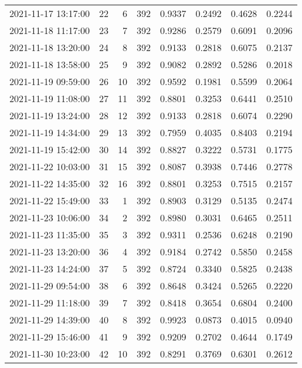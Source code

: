 \begin{longtable}{lrrrrrrr}
2021-11-17 13:17:00 &   22 &    6 &    392 &   0.9337 & 0.2492 & 0.4628 & 0.2244 \\
2021-11-18 11:17:00 &   23 &    7 &    392 &   0.9286 & 0.2579 & 0.6091 & 0.2096 \\
2021-11-18 13:20:00 &   24 &    8 &    392 &   0.9133 & 0.2818 & 0.6075 & 0.2137 \\
2021-11-18 13:58:00 &   25 &    9 &    392 &   0.9082 & 0.2892 & 0.5286 & 0.2018 \\
2021-11-19 09:59:00 &   26 &   10 &    392 &   0.9592 & 0.1981 & 0.5599 & 0.2064 \\
2021-11-19 11:08:00 &   27 &   11 &    392 &   0.8801 & 0.3253 & 0.6441 & 0.2510 \\
2021-11-19 13:24:00 &   28 &   12 &    392 &   0.9133 & 0.2818 & 0.6074 & 0.2290 \\
2021-11-19 14:34:00 &   29 &   13 &    392 &   0.7959 & 0.4035 & 0.8403 & 0.2194 \\
2021-11-19 15:42:00 &   30 &   14 &    392 &   0.8827 & 0.3222 & 0.5731 & 0.1775 \\
2021-11-22 10:03:00 &   31 &   15 &    392 &   0.8087 & 0.3938 & 0.7446 & 0.2778 \\
2021-11-22 14:35:00 &   32 &   16 &    392 &   0.8801 & 0.3253 & 0.7515 & 0.2157 \\
2021-11-22 15:49:00 &   33 &    1 &    392 &   0.8903 & 0.3129 & 0.5135 & 0.2474 \\
2021-11-23 10:06:00 &   34 &    2 &    392 &   0.8980 & 0.3031 & 0.6465 & 0.2511 \\
2021-11-23 11:35:00 &   35 &    3 &    392 &   0.9311 & 0.2536 & 0.6248 & 0.2190 \\
2021-11-23 13:20:00 &   36 &    4 &    392 &   0.9184 & 0.2742 & 0.5850 & 0.2458 \\
2021-11-23 14:24:00 &   37 &    5 &    392 &   0.8724 & 0.3340 & 0.5825 & 0.2438 \\
2021-11-29 09:54:00 &   38 &    6 &    392 &   0.8648 & 0.3424 & 0.5265 & 0.2220 \\
2021-11-29 11:18:00 &   39 &    7 &    392 &   0.8418 & 0.3654 & 0.6804 & 0.2400 \\
2021-11-29 14:39:00 &   40 &    8 &    392 &   0.9923 & 0.0873 & 0.4015 & 0.0940 \\
2021-11-29 15:46:00 &   41 &    9 &    392 &   0.9209 & 0.2702 & 0.4644 & 0.1749 \\
2021-11-30 10:23:00 &   42 &   10 &    392 &   0.8291 & 0.3769 & 0.6301 & 0.2612 \\

\end{longtable}

